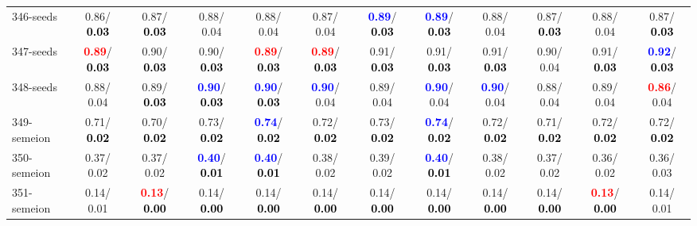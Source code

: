 \begin{table}[h]
\begin{center}
{\begin{tabular}{lc|c|c|c|c|c|c|c|c|c|c}
346-seeds &   0.86/\textcolor{black}{\textbf{  0.03}} &   0.87/\textcolor{black}{\textbf{  0.03}} &   0.88/  0.04 &   0.88/  0.04 &   0.87/  0.04 & \textcolor{blue}{\textbf{  0.89}}/\textcolor{black}{\textbf{  0.03}} & \textcolor{blue}{\textbf{  0.89}}/\textcolor{black}{\textbf{  0.03}} &   0.88/  0.04 &   0.87/\textcolor{black}{\textbf{  0.03}} &   0.88/  0.04 &   0.87/\textcolor{black}{\textbf{  0.03}} \\
347-seeds & \textcolor{red}{\textbf{  0.89}}/\textcolor{black}{\textbf{  0.03}} &   0.90/\textcolor{black}{\textbf{  0.03}} &   0.90/\textcolor{black}{\textbf{  0.03}} & \textcolor{red}{\textbf{  0.89}}/\textcolor{black}{\textbf{  0.03}} & \textcolor{red}{\textbf{  0.89}}/\textcolor{black}{\textbf{  0.03}} &   0.91/\textcolor{black}{\textbf{  0.03}} &   0.91/\textcolor{black}{\textbf{  0.03}} &   0.91/\textcolor{black}{\textbf{  0.03}} &   0.90/  0.04 &   0.91/\textcolor{black}{\textbf{  0.03}} & \textcolor{blue}{\textbf{  0.92}}/\textcolor{black}{\textbf{  0.03}} \\
348-seeds &   0.88/  0.04 &   0.89/\textcolor{black}{\textbf{  0.03}} & \textcolor{blue}{\textbf{  0.90}}/\textcolor{black}{\textbf{  0.03}} & \textcolor{blue}{\textbf{  0.90}}/\textcolor{black}{\textbf{  0.03}} & \textcolor{blue}{\textbf{  0.90}}/  0.04 &   0.89/  0.04 & \textcolor{blue}{\textbf{  0.90}}/  0.04 & \textcolor{blue}{\textbf{  0.90}}/  0.04 &   0.88/  0.04 &   0.89/  0.04 & \textcolor{red}{\textbf{  0.86}}/  0.04 \\ \hline
349-semeion &   0.71/\textcolor{black}{\textbf{  0.02}} &   0.70/\textcolor{black}{\textbf{  0.02}} &   0.73/\textcolor{black}{\textbf{  0.02}} & \textcolor{blue}{\textbf{  0.74}}/\textcolor{black}{\textbf{  0.02}} &   0.72/\textcolor{black}{\textbf{  0.02}} &   0.73/\textcolor{black}{\textbf{  0.02}} & \textcolor{blue}{\textbf{  0.74}}/\textcolor{black}{\textbf{  0.02}} &   0.72/\textcolor{black}{\textbf{  0.02}} &   0.71/\textcolor{black}{\textbf{  0.02}} &   0.72/\textcolor{black}{\textbf{  0.02}} &   0.72/\textcolor{black}{\textbf{  0.02}} \\
350-semeion &   0.37/  0.02 &   0.37/  0.02 & \textcolor{blue}{\textbf{  0.40}}/\textcolor{black}{\textbf{  0.01}} & \textcolor{blue}{\textbf{  0.40}}/\textcolor{black}{\textbf{  0.01}} &   0.38/  0.02 &   0.39/  0.02 & \textcolor{blue}{\textbf{  0.40}}/\textcolor{black}{\textbf{  0.01}} &   0.38/  0.02 &   0.37/  0.02 &   0.36/  0.02 &   0.36/  0.03 \\
351-semeion &   0.14/  0.01 & \textcolor{red}{\textbf{  0.13}}/\textcolor{black}{\textbf{  0.00}} &   0.14/\textcolor{black}{\textbf{  0.00}} &   0.14/\textcolor{black}{\textbf{  0.00}} &   0.14/\textcolor{black}{\textbf{  0.00}} &   0.14/\textcolor{black}{\textbf{  0.00}} &   0.14/\textcolor{black}{\textbf{  0.00}} &   0.14/\textcolor{black}{\textbf{  0.00}} &   0.14/\textcolor{black}{\textbf{  0.00}} & \textcolor{red}{\textbf{  0.13}}/\textcolor{black}{\textbf{  0.00}} &   0.14/  0.01 \\

\end{tabular}}
\end{center}
\end{table}
